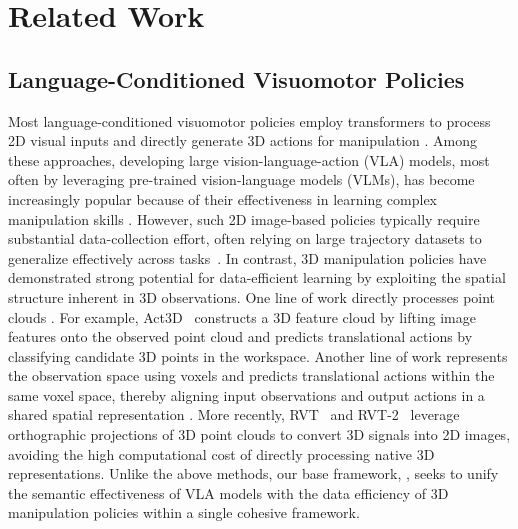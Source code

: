 \section{Related Work}
\label{sec:related_work}

\subsection{Language-Conditioned Visuomotor Policies}

Most language-conditioned visuomotor policies employ transformers to process
2D visual inputs and directly generate 3D actions for manipulation
\cite{brohan2022rt,brohan2023rt,kimopenvla,black2024pi_0,
li2023vision}.
Among these approaches, developing large vision-language-action (VLA)
models, most often by leveraging pre-trained vision-language models (VLMs),
has become increasingly popular because of their effectiveness in learning
complex manipulation skills
\cite{brohan2023rt,kimopenvla,li2023vision,black2024pi_0,
pertsch2025fast,intelligence2025pi_06star,intelligence2026pi_07,
generalist2025gen0,generalist2026gen1,genesis2026gene265,
sunday2026act2preview}.
However, such 2D image-based policies typically require substantial
data-collection effort, often relying on large trajectory datasets to
generalize effectively across tasks~\cite{o2024open}.
In contrast, 3D manipulation policies have demonstrated strong potential for
data-efficient learning by exploiting the spatial structure inherent in 3D
observations.
One line of work directly processes point clouds
\cite{chen2023polarnet,yuan2023m2t2,yang2025fp3,gervet2023act3d,
3d-da,garcia2024towards}.
For example, Act3D~\cite{gervet2023act3d} constructs a 3D feature cloud by
lifting image features onto the observed point cloud and predicts
translational actions by classifying candidate 3D points in the workspace.
Another line of work represents the observation space using voxels and
predicts translational actions within the same voxel space, thereby aligning
input observations and output actions in a shared spatial representation
\cite{shridhar2023perceiver,james2022coarse}.
More recently, RVT~\cite{goyal2023rvt} and
RVT-2~\cite{goyal2024rvt} leverage orthographic projections of 3D point
clouds to convert 3D signals into 2D images, avoiding the high computational
cost of directly processing native 3D representations.
Unlike the above methods, our base framework, \method, seeks to unify the
semantic effectiveness of VLA models with the data efficiency of 3D
manipulation policies within a single cohesive framework.


